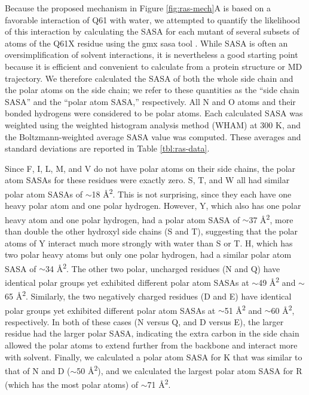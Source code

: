 Because the proposed mechanism in Figure \ref{fig:ras-mech}A is based on a favorable interaction of Q61 with water, we attempted to quantify the likelihood of this interaction by calculating the SASA for each mutant of several subsets of atoms of the Q61X residue using the gmx sasa tool \cite{Eisenhaber1995}.
While SASA is often an oversimplification of solvent interactions, it is nevertheless a good starting point because it is efficient and convenient to calculate from a protein structure or MD trajectory. 
We therefore calculated the SASA of both the whole side chain and the polar atoms on the side chain; we refer to these quantities as the ``side chain SASA'' and the ``polar atom SASA,'' respectively. 
All N and O atoms and their bonded hydrogens were considered to be polar atoms. 
Each calculated SASA was weighted using the weighted histogram analysis method (WHAM) at 300 K, and the Boltzmann-weighted average SASA value was computed. 
These averages and standard deviations are reported in Table \ref{tbl:ras-data}.

Since F, I, L, M, and V do not have polar atoms on their side chains, the polar atom SASAs for these residues were exactly zero. 
S, T, and W all had similar polar atom SASAs of $\sim$18 \si{\angstrom^2}. 
This is not surprising, since they each have one heavy polar atom and one polar hydrogen. 
However, Y, which also has one polar heavy atom and one polar hydrogen, had a polar atom SASA of $\sim$37 \si{\angstrom^2}, more than double the other hydroxyl side chains (S and T), suggesting that the polar atoms of Y interact much more strongly with water than S or T. 
H, which has two polar heavy atoms but only one polar hydrogen, had a similar polar atom SASA of $\sim$34 \si{\angstrom^2}. 
The other two polar, uncharged residues (N and Q) have identical polar groups yet exhibited different polar atom SASAs at $\sim$49 \si{\angstrom^2} and $\sim$65 \si{\angstrom^2}. 
Similarly, the two negatively charged residues (D and E) have identical polar groups yet exhibited different polar atom SASAs at $\sim$51 \si{\angstrom^2} and $\sim$60 \si{\angstrom^2}, respectively. 
In both of these cases (N versus Q, and D versus E), the larger residue had the larger polar SASA, indicating the extra carbon in the side chain allowed the polar atoms to extend further from the backbone and interact more with solvent. 
Finally, we calculated a polar atom SASA for K that was similar to that of N and D ($\sim$50 \si{\angstrom^2}), and we calculated the largest polar atom SASA for R (which has the most polar atoms) of $\sim$71 \si{\angstrom^2}.


